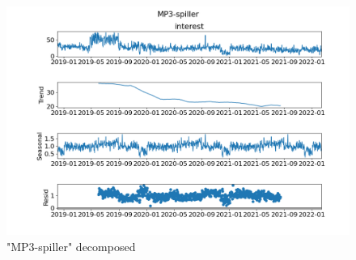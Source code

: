 \begin{figure}[h!]
  \centering
  \includegraphics[width=\textwidth]{./figs/code_generated/time-serie-MP3-spiller_decomposed.png}
  \hfill
  \caption{"MP3-spiller" decomposed}
  \label{fig:dataset:mp3-spiller-decomposed}
\end{figure}



